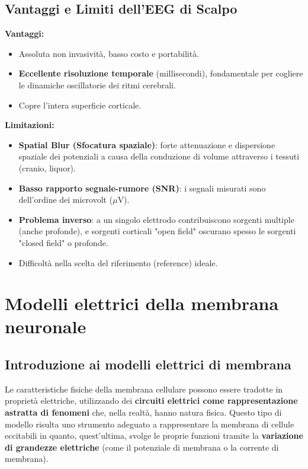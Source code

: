 \section{Vantaggi e Limiti dell'EEG di Scalpo}

\textbf{Vantaggi:}
\begin{itemize}
    \item Assoluta non invasività, basso costo e portabilità.
    \item \textbf{Eccellente risoluzione temporale} (millisecondi), fondamentale per cogliere le dinamiche oscillatorie dei ritmi cerebrali.
    \item Copre l'intera superficie corticale.
\end{itemize}

\textbf{Limitazioni:}
\begin{itemize}
    \item \textbf{Spatial Blur (Sfocatura spaziale)}: forte attenuazione e dispersione spaziale dei potenziali a causa della conduzione di volume attraverso i tessuti (cranio, liquor).
    \item \textbf{Basso rapporto segnale-rumore (SNR)}: i segnali misurati sono dell'ordine dei microvolt ($\mu$V).
    \item \textbf{Problema inverso}: a un singolo elettrodo contribuiscono sorgenti multiple (anche profonde), e sorgenti corticali "open field" oscurano spesso le sorgenti "closed field" o profonde.
    \item Difficoltà nella scelta del riferimento (reference) ideale.
\end{itemize}


\chapter{Modelli elettrici della membrana neuronale}

\section{Introduzione ai modelli elettrici di membrana}

Le caratteristiche fisiche della membrana cellulare possono essere tradotte in proprietà
elettriche, utilizzando dei \textbf{circuiti elettrici come rappresentazione astratta di fenomeni }che, nella realtà, hanno natura fisica. Questo tipo di modello risulta uno strumento adeguato a rappresentare la membrana di cellule eccitabili in quanto, quest'ultima, svolge le proprie funzioni tramite la \textbf{variazione di grandezze elettriche }(come il potenziale di membrana o la corrente di membrana).

